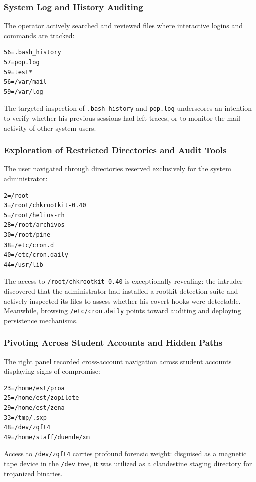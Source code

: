 \subsubsection{System Log and History Auditing}

The operator actively searched and reviewed files where interactive logins and commands are tracked:
\begin{lstlisting}[style=terminal]
56=.bash_history
57=pop.log
59=test*
56=/var/mail
59=/var/log
\end{lstlisting}
The targeted inspection of \texttt{.bash\_history} and \texttt{pop.log} underscores an intention to verify whether his previous sessions had left traces, or to monitor the mail activity of other system users.

\subsubsection{Exploration of Restricted Directories and Audit Tools}

The user navigated through directories reserved exclusively for the system administrator:
\begin{lstlisting}[style=terminal]
2=/root
3=/root/chkrootkit-0.40
5=/root/helios-rh
28=/root/archivos
30=/root/pine
38=/etc/cron.d
40=/etc/cron.daily
44=/usr/lib
\end{lstlisting}
The access to \texttt{/root/chkrootkit-0.40} is exceptionally revealing: the intruder discovered that the administrator had installed a rootkit detection suite and actively inspected its files to assess whether his covert hooks were detectable. Meanwhile, browsing \texttt{/etc/cron.daily} points toward auditing and deploying persistence mechanisms.

\subsubsection{Pivoting Across Student Accounts and Hidden Paths}

The right panel recorded cross-account navigation across student accounts displaying signs of compromise:
\begin{lstlisting}[style=terminal]
23=/home/est/proa
25=/home/est/zopilote
29=/home/est/zena
33=/tmp/.sxp
48=/dev/zqft4
49=/home/staff/duende/xm
\end{lstlisting}
Access to \texttt{/dev/zqft4} carries profound forensic weight: disguised as a magnetic tape device in the \texttt{/dev} tree, it was utilized as a clandestine staging directory for trojanized binaries.

